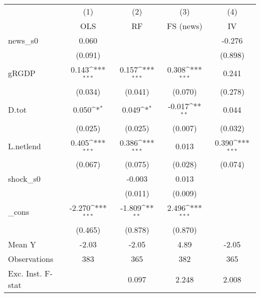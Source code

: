 {
\def\sym#1{\ifmmode^{#1}\else\(^{#1}\)\fi}
\begin{tabular}{l*{4}{c}}
\toprule
            &\multicolumn{1}{c}{(1)}&\multicolumn{1}{c}{(2)}&\multicolumn{1}{c}{(3)}&\multicolumn{1}{c}{(4)}\\
            &\multicolumn{1}{c}{OLS}&\multicolumn{1}{c}{RF}&\multicolumn{1}{c}{FS (news)}&\multicolumn{1}{c}{IV}\\
\midrule
news\_s0     &       0.060         &                     &                     &      -0.276         \\
            &     (0.091)         &                     &                     &     (0.898)         \\
\addlinespace
gRGDP       &       0.143\sym{***}&       0.157\sym{***}&       0.308\sym{***}&       0.241         \\
            &     (0.034)         &     (0.041)         &     (0.070)         &     (0.278)         \\
\addlinespace
D.tot       &       0.050\sym{*}  &       0.049\sym{*}  &      -0.017\sym{**} &       0.044         \\
            &     (0.025)         &     (0.025)         &     (0.007)         &     (0.032)         \\
\addlinespace
L.netlend   &       0.405\sym{***}&       0.386\sym{***}&       0.013         &       0.390\sym{***}\\
            &     (0.067)         &     (0.075)         &     (0.028)         &     (0.074)         \\
\addlinespace
shock\_s0    &                     &      -0.003         &       0.013         &                     \\
            &                     &     (0.011)         &     (0.009)         &                     \\
\addlinespace
\_cons      &      -2.270\sym{***}&      -1.809\sym{**} &       2.496\sym{***}&                     \\
            &     (0.465)         &     (0.878)         &     (0.870)         &                     \\
\midrule
Mean Y      &       -2.03         &       -2.05         &        4.89         &       -2.05         \\
Observations&         383         &         365         &         382         &         365         \\
Exc. Inst. F-stat&                     &       0.097         &       2.248         &       2.008         \\
\bottomrule
\end{tabular}
}
